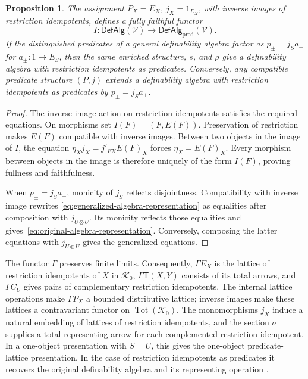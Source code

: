\documentclass[11pt]{article}
\newtheorem{proposition}[theorem]{Proposition}
\theoremstyle{definition}
\theoremstyle{remark}
\begin{document}
\begin{proposition}\label{prop:algebra-comparison}
The assignment $P_X=E_X$, $j_X=1_{E_X}$, with inverse images of restriction idempotents,
defines a fully faithful functor
\[
 I:\mathsf{DefAlg}(\mathscr V)
   \longrightarrow\mathsf{DefAlg}_{\mathrm{pred}}(\mathscr V).
\]
If the distinguished predicates of a general definability algebra
factor as $p_\pm=j_Sa_\pm$ for $a_\pm:1\to E_S$, then the same
enriched structure, $s$, and $\rho$ give a definability algebra with restriction idempotents as predicates. Conversely, any compatible predicate structure $(P,j)$
extends a definability algebra with restriction idempotents as predicates by $p_\pm=j_Sa_\pm$.
\end{proposition}
\begin{proof}
The inverse-image action on restriction idempotents satisfies the required equations.
On morphisms set $I(F)=(F,E(F))$. Preservation of restriction
makes $E(F)$ compatible with inverse images. Between two objects
in the image of $I$, the equation
$\eta_Xj_X=j'_{FX}E(F)_X$ forces $\eta_X=E(F)_X$.
Every morphism between objects in the image is therefore uniquely
of the form $I(F)$, proving fullness and faithfulness.

When $p_\pm=j_Sa_\pm$, monicity of $j_S$ reflects disjointness.
Compatibility with inverse image rewrites
\eqref{eq:generalized-algebra-representation} as equalities after
composition with $j_{U\otimes U}$. Its monicity reflects those
equalities and gives~\eqref{eq:original-algebra-representation}.
Conversely, composing the latter equations with
$j_{U\otimes U}$ gives the generalized equations.
\end{proof}

The functor $\Gamma$ preserves finite limits. Consequently,
$\Gamma E_X$ is the lattice of restriction idempotents of $X$ in $\mathcal K_0$,
$\Gamma \mathsf T(X,Y)$ consists of its total arrows, and
$\Gamma C_U$ gives pairs of complementary restriction idempotents. The internal lattice
operations make $\Gamma P_X$ a bounded distributive lattice;
inverse images make these lattices a contravariant functor on
$\operatorname{Tot}(\mathcal K_0)$. The monomorphisms $j_X$
induce a natural embedding of lattices of restriction idempotents, and the section
$\sigma$ supplies a total representing arrow for each complemented restriction idempotent. In a one-object presentation with $S=U$, this gives the
one-object predicate-lattice presentation. In the case of restriction idempotents as predicates it recovers the original definability algebra and its
representing operation \cite[Section~4]{DefinabilityAlgebras}.
\end{document}
